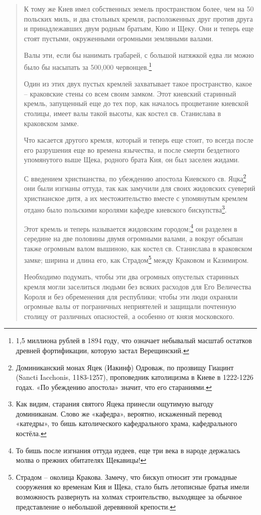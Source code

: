 \begin{quotation}
К тому же Киев имел собственных земель пространством более, чем на 50 польских миль, и два стольных кремля, расположенных друг против друга и принадлежавших двум родным братьям, Кию и Щеку. Они и теперь еще стоят пустыми, окруженными огромными земляными валами. 

Валы эти, если бы нанимать грабарей, с большой натяжкой едва ли можно было бы насыпать за 500,000 червонцев.\footnote{1,5 миллиона рублей в 1894 году, что означает небывалый масштаб остатков древней фортификации, которую застал Верещинский.}

Один из этих двух пустых кремлей захватывает такое пространство, какое – краковские стены со всем своим замком. Этот киевский старинный кремль, запущенный еще до тех пор, как началось процветание киевской столицы, имеет валы такой высоты, как костел св. Станислава в краковском замке.

Что касается другого кремля, который и теперь еще стоит, то всегда после его разрушения еще во времена язычества, и после смерти бездетного упомянутого выше Щека, родного брата Кия, он был заселен жидами.

С введением христианства, по убеждению апостола Киевского св. Яцка\footnote{Доминиканский монах Яцек (Иакинф) Одроваж, по прозвищу Гиацинт (Sancti Iacchonis, 1183-1257), проповедник католицизма в Киеве в 1222-1226 годах. «По убеждению апостола» значит, что его стараниями.} они были изгнаны оттуда, так как замучили для своих жидовских суеверий христианское дитя, а их местожительство вместе с упомянутым кремлем отдано было польскими королями кафедре киевского бискупства\footnote{Как видим, старания святого Яцека принесли ощутимую выгоду доминиканам. Слово же «кафедра», вероятно, искаженный перевод «катедры», то бишь католического кафедрального храма, кафедрального костёла.}.

Этот кремль и теперь называется жидовским городом;\footnote{То бишь после изгнания оттуда иудеев, еще три века в народе держалась молва о прежних обитателях Щекавицы!} он разделен в середине на две половины двумя огромными валами, а вокруг обсыпан также огромным валом вышиною, как костел св. Станислава в краковском замке; ширина и длина его, как Страдом\footnote{Страдом – околица Кракова. Замечу, что бискуп относит эти громадные сооружения ко временам Кия и Щека, стало быть летописные братья имели возможность развернуть на холмах строительство, выходящее за обычное представление о небольшой деревянной крепости.} между Краковом и Казимиром.

Необходимо подумать, чтобы эти два огромных опустелых старинных кремля могли заселиться людьми без всяких расходов для Его Величества Короля и без обременения для республики; чтобы эти люди охраняли огромные валы от пограничных неприятелей и защищали почтенную столицу от различных опасностей, а особенно от князя московского.
\end{quotation}

